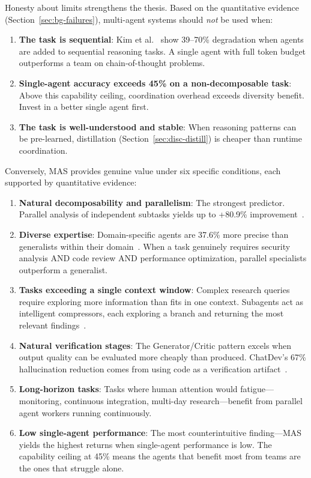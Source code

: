 \documentclass{article}
\begin{document}
Honesty about limits strengthens the thesis. Based on the quantitative evidence
(Section~\ref{sec:bg-failures}), multi-agent systems should \emph{not} be used when:

\begin{enumerate}[nosep]
  \item \textbf{The task is sequential}: Kim et al.~\citep{kim2025scaling} show 39--70\%
    degradation when agents are added to sequential reasoning tasks. A single agent with
    full token budget outperforms a team on chain-of-thought problems.
  \item \textbf{Single-agent accuracy exceeds 45\% on a non-decomposable task}: Above
    this capability ceiling, coordination overhead exceeds diversity benefit. Invest in
    a better single agent first.
  \item \textbf{The task is well-understood and stable}: When reasoning patterns can be
    pre-learned, distillation (Section~\ref{sec:disc-distill}) is cheaper than runtime
    coordination.
\end{enumerate}

\noindent
Conversely, MAS provides genuine value under six specific conditions, each supported by
quantitative evidence:

\begin{enumerate}[nosep]
  \item \textbf{Natural decomposability and parallelism}: The strongest predictor.
    Parallel analysis of independent subtasks yields up to +80.9\%
    improvement~\citep{kim2025scaling}.
  \item \textbf{Diverse expertise}: Domain-specific agents are 37.6\% more precise than
    generalists within their domain~\citep{bogavelli2025agentarch}. When a task
    genuinely requires security analysis AND code review AND performance optimization,
    parallel specialists outperform a generalist.
  \item \textbf{Tasks exceeding a single context window}: Complex research queries
    require exploring more information than fits in one context. Subagents act as
    intelligent compressors, each exploring a branch and returning the most relevant
    findings~\citep{anthropic2025building}.
  \item \textbf{Natural verification stages}: The Generator/Critic pattern excels when
    output quality can be evaluated more cheaply than produced. ChatDev's 67\%
    hallucination reduction comes from using code as a verification
    artifact~\citep{qian2024chatdev}.
  \item \textbf{Long-horizon tasks}: Tasks where human attention would fatigue---monitoring,
    continuous integration, multi-day research---benefit from parallel agent workers
    running continuously.
  \item \textbf{Low single-agent performance}: The most counterintuitive finding---MAS
    yields the highest returns when single-agent performance is low. The capability
    ceiling at 45\% means the agents that benefit most from teams are the ones that
    struggle alone.
\end{enumerate}
\end{document}
